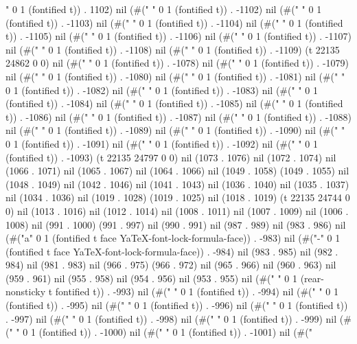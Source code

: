 " 0 1 (fontified t)) . 1102) nil (#(" " 0 1 (fontified t)) . -1102) nil (#(" " 0 1 (fontified t)) . -1103) nil (#(" " 0 1 (fontified t)) . -1104) nil (#(" " 0 1 (fontified t)) . -1105) nil (#(" " 0 1 (fontified t)) . -1106) nil (#(" " 0 1 (fontified t)) . -1107) nil (#(" " 0 1 (fontified t)) . -1108) nil (#(" " 0 1 (fontified t)) . -1109) (t 22135 24862 0 0) nil (#("
" 0 1 (fontified t)) . -1078) nil (#(" " 0 1 (fontified t)) . -1079) nil (#(" " 0 1 (fontified t)) . -1080) nil (#(" " 0 1 (fontified t)) . -1081) nil (#(" " 0 1 (fontified t)) . -1082) nil (#(" " 0 1 (fontified t)) . -1083) nil (#(" " 0 1 (fontified t)) . -1084) nil (#(" " 0 1 (fontified t)) . -1085) nil (#(" " 0 1 (fontified t)) . -1086) nil (#(" " 0 1 (fontified t)) . -1087) nil (#(" " 0 1 (fontified t)) . -1088) nil (#(" " 0 1 (fontified t)) . -1089) nil (#(" " 0 1 (fontified t)) . -1090) nil (#(" " 0 1 (fontified t)) . -1091) nil (#(" " 0 1 (fontified t)) . -1092) nil (#(" " 0 1 (fontified t)) . -1093) (t 22135 24797 0 0) nil (1073 . 1076) nil (1072 . 1074) nil (1066 . 1071) nil (1065 . 1067) nil (1064 . 1066) nil (1049 . 1058) (1049 . 1055) nil (1048 . 1049) nil (1042 . 1046) nil (1041 . 1043) nil (1036 . 1040) nil (1035 . 1037) nil (1034 . 1036) nil (1019 . 1028) (1019 . 1025) nil (1018 . 1019) (t 22135 24744 0 0) nil (1013 . 1016) nil (1012 . 1014) nil (1008 . 1011) nil (1007 . 1009) nil (1006 . 1008) nil (991 . 1000) (991 . 997) nil (990 . 991) nil (987 . 989) nil (983 . 986) nil (#("a" 0 1 (fontified t face YaTeX-font-lock-formula-face)) . -983) nil (#("-" 0 1 (fontified t face YaTeX-font-lock-formula-face)) . -984) nil (983 . 985) nil (982 . 984) nil (981 . 983) nil (966 . 975) (966 . 972) nil (965 . 966) nil (960 . 963) nil (959 . 961) nil (955 . 958) nil (954 . 956) nil (953 . 955) nil (#("
" 0 1 (rear-nonsticky t fontified t)) . -993) nil (#(" " 0 1 (fontified t)) . -994) nil (#(" " 0 1 (fontified t)) . -995) nil (#(" " 0 1 (fontified t)) . -996) nil (#(" " 0 1 (fontified t)) . -997) nil (#(" " 0 1 (fontified t)) . -998) nil (#(" " 0 1 (fontified t)) . -999) nil (#(" " 0 1 (fontified t)) . -1000) nil (#(" " 0 1 (fontified t)) . -1001) nil (#("
